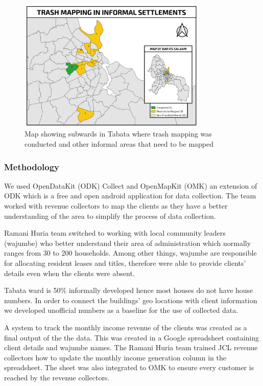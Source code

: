 \documentclass[a4paper,12pt,twoside]{article}
\begin{document}
\begin{figure}[h]
  \caption{Map showing subwards in Tabata where trash mapping was conducted and other informal areas that need to be mapped}
  \centering
 \includegraphics[width=0.8\textwidth]{images/JCL_Trash_Mapping.png}
\end{figure}

\subsubsection{Methodology}
\begin{multicols}{2}

We used OpenDataKit (ODK) Collect and OpenMapKit (OMK) an extension of ODK which is a free and open android application for data collection. The team worked with revenue collectors to map the clients as they have a better understanding of the area to simplify the process of data collection. 

Ramani Huria team switched to working with local community leaders (wajumbe) who better understand their area of administration which normally ranges from 30 to 200 households. Among other things, wajumbe  are responsible for allocating resident leases and titles, therefore were able to provide clients’ details even when the clients were absent.

Tabata ward is 50\% informally developed hence most houses do not have house numbers. In order to connect the buildings’ geo locations with client information we developed unofficial numbers as a baseline for the use of collected data.

A system to track the monthly income revenue of the clients was created as a final output of the the data. This was created in a Google spreadsheet containing client details and wajumbe names. The Ramani Huria team trained JCL revenue collectors how to update the monthly income generation column in the spreadsheet. The sheet was also integrated to OMK to ensure every customer is reached by the revenue collectors.

\end{multicols}
\end{document}

